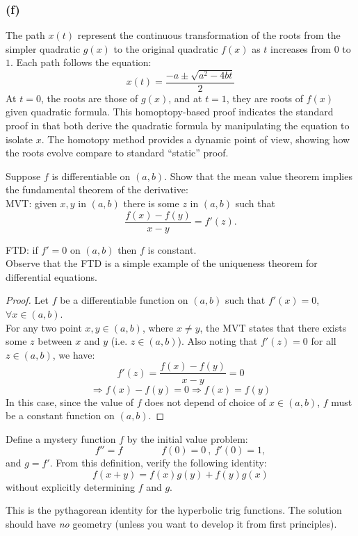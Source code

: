 \documentclass{article}
\begin{document}
\subsubsection*{(f)}
The path $x(t)$ represent the continuous transformation of the roots from the simpler quadratic $g(x)$ to the original quadratic $f(x)$ as $t$ increases from $0$ to $1$.
Each path follows the equation:
\[ x(t) = \frac{-a \pm \sqrt{a^2 - 4bt}}{2} \]
At $t = 0$, the roots are those of $g(x)$, and at $t=1$, they are roots of $f(x)$ given quadratic formula. This homoptopy-based proof indicates the standard proof in that both derive the quadratic formula by manipulating the equation to isolate $x$.
The homotopy method provides a dynamic point of view, showing how the roots evolve compare to standard ``static'' proof.


\begin{problem}
    Suppose \(f\) is differentiable on \((a,b)\). Show that the mean value theorem implies the fundamental theorem of the derivative:\\
    
    MVT: given \(x,y\) in \((a,b)\) there is some \(z\) in \((a,b)\) such that
    \[\frac{f(x) - f(y)}{x-y} = f'(z).\]

    FTD: if \(f' = 0\) on \((a,b)\) then \(f\) is constant.\\

    Observe that the FTD is a simple example of the uniqueness theorem for differential equations.
\end{problem}


\begin{proof}
    Let $f$ be a differentiable function on $(a,b)$ such that $f'(x) = 0$, $\forall x \in (a,b)$.
    \\
    For any two point $x,y \in (a,b)$, where $x \neq y$, the MVT states that there exists some $z$ between $x$ and $y$ (i.e. $z \in (a,b)$). Also noting that $f'(z) = 0$ for all $z \in (a, b)$, we have:
    \[ f'(z) = \frac{f(x) - f(y)}{x - y} = 0 \]
    \[ \Rightarrow f(x) - f(y) = 0 \Rightarrow f(x) = f(y) \]
    In this case, since the value of $f$ does not depend of choice of $x \in (a, b)$, $f$ must be a constant function on $(a,b)$.
\end{proof}


\begin{problem}
    Define a mystery function \(f\) by the initial value problem:
    \[f'' = f\hspace{4em}f(0) = 0\ ,\ f'(0) = 1,\]
    and \(g=f'\). From this definition, verify the following identity:
    \[f(x+y) = f(x)g(y) + f(y)g(x)\]
    without explicitly determining \(f\) and \(g\).
    
    \hspace{2em}This is the pythagorean identity for the hyperbolic trig functions. The solution should have \emph{no} geometry (unless you want to develop it from first principles).
\end{problem}
\end{document}
